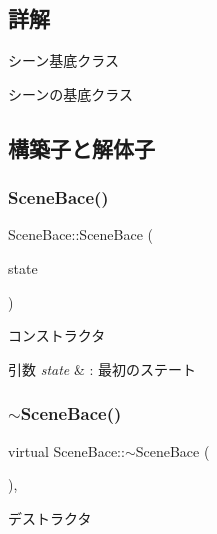 \subsection{詳解}
シーン基底クラス 

シーンの基底クラス 

\subsection{構築子と解体子}
\mbox{\label{class_scene_bace_a485fc147477e9feb63688f32d81254aa}} 
\subsubsection{\texorpdfstring{Scene\+Bace()}{SceneBace()}}
{\footnotesize\ttfamily Scene\+Bace\+::\+Scene\+Bace (\begin{DoxyParamCaption}\item[{\mbox{\hyperlink{class_scene_bace_1_1_state_abstract}{State\+Abstract}} $\ast$}]{state }\end{DoxyParamCaption})\hspace{0.3cm}{\ttfamily [inline]}}



コンストラクタ 


\begin{DoxyParams}{引数}
{\em state} & \+: 最初のステート \\
\hline
\end{DoxyParams}
\mbox{\label{class_scene_bace_a99e98adcd3bbae91e12af543a1c6c85b}} 
\subsubsection{\texorpdfstring{$\sim$\+Scene\+Bace()}{~SceneBace()}}
{\footnotesize\ttfamily virtual Scene\+Bace\+::$\sim$\+Scene\+Bace (\begin{DoxyParamCaption}{ }\end{DoxyParamCaption})\hspace{0.3cm}{\ttfamily [inline]}, {\ttfamily [virtual]}}



デストラクタ 



